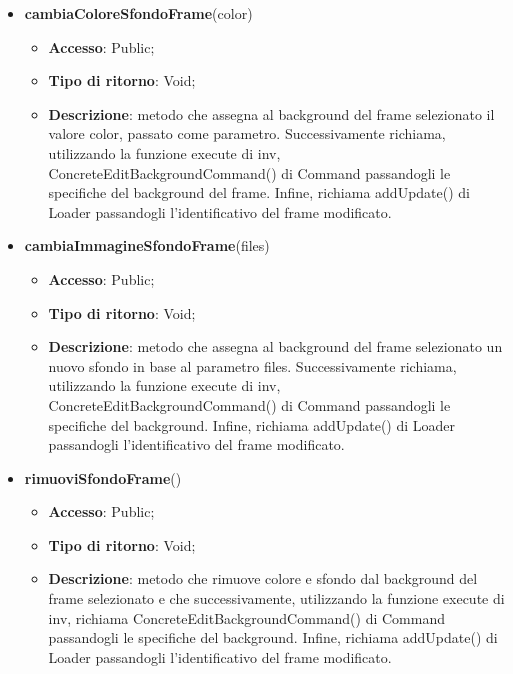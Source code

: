 {{\begin{itemize}
\begin{itemize}
				\item \textbf{Descrizione}: metodo che viene richiamato solo in seguito ad una operazione di undo/redo e che per questo, si occupa solamente di aggiornare il background del frame spec.id nella view.
			\end{itemize}
			\item \textbf{cambiaColoreSfondoFrame}(color)
			\begin{itemize}
				\item \textbf{Accesso}: Public;
				\item \textbf{Tipo di ritorno}: Void;
				\item \textbf{Descrizione}: metodo che assegna al background del frame selezionato il valore color, passato come parametro. Successivamente richiama, utilizzando la funzione execute di inv, ConcreteEditBackgroundCommand() di Command passandogli le specifiche del background del frame. Infine, richiama addUpdate() di Loader passandogli l'identificativo del frame modificato.
			\end{itemize}
			\item \textbf{cambiaImmagineSfondoFrame}(files)
			\begin{itemize}
				\item \textbf{Accesso}: Public;
				\item \textbf{Tipo di ritorno}: Void;
				\item \textbf{Descrizione}: metodo che assegna al background del frame selezionato un nuovo sfondo in base al parametro files. Successivamente richiama, utilizzando la funzione execute di inv, ConcreteEditBackgroundCommand() di Command passandogli le specifiche del background. Infine, richiama addUpdate() di Loader passandogli l'identificativo del frame modificato.
			\end{itemize}
			\item \textbf{rimuoviSfondoFrame}()
			\begin{itemize}
				\item \textbf{Accesso}: Public;
				\item \textbf{Tipo di ritorno}: Void;
				\item \textbf{Descrizione}: metodo che rimuove colore e sfondo dal background del frame selezionato e che successivamente, utilizzando la funzione execute di inv, richiama ConcreteEditBackgroundCommand() di Command passandogli le specifiche del background. Infine, richiama addUpdate() di Loader passandogli l'identificativo del frame modificato.
			\end{itemize}

\end{itemize}}}
